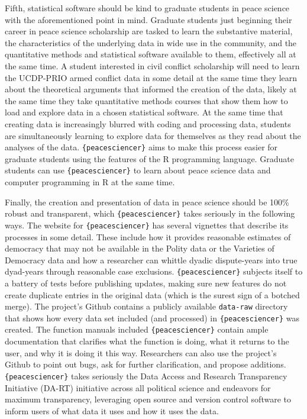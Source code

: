 \documentclass[
  11pt,
]{article}
\begin{document}
Fifth, statistical software should be kind to graduate students in peace science with the aforementioned point in mind. Graduate students just beginning their career in peace science scholarship are tasked to learn the substantive material, the characteristics of the underlying data in wide use in the community, and the quantitative methods and statistical software available to them, effectively all at the same time. A student interested in civil conflict scholarship will need to learn the UCDP-PRIO armed conflict data in some detail at the same time they learn about the theoretical arguments that informed the creation of the data, likely at the same time they take quantitative methods courses that show them how to load and explore data in a chosen statistical software. At the same time that creating data is increasingly blurred with coding and processing data, students are simultaneously learning to explore data for themselves as they read about the analyses of the data. \texttt{\{peacesciencer\}} aims to make this process easier for graduate students using the features of the R programming language. Graduate students can use \texttt{\{peacesciencer\}} to learn about peace science data and computer programming in R at the same time.

Finally, the creation and presentation of data in peace science should be 100\% robust and transparent, which \texttt{\{peacesciencer\}} takes seriously in the following ways. The website for \texttt{\{peacesciencer\}} has several vignettes that describe its processes in some detail. These include how it provides reasonable estimates of democracy that may not be available in the Polity data or the Varieties of Democracy data and how a researcher can whittle dyadic dispute-years into true dyad-years through reasonable case exclusions. \texttt{\{peacesciencer\}} subjects itself to a battery of tests before publishing updates, making sure new features do not create duplicate entries in the original data (which is the surest sign of a botched merge). The project's Github contains a publicly available \texttt{data-raw} directory that shows how every data set included (and processed) in \texttt{\{peacesciencer\}} was created. The function manuals included \texttt{\{peacesciencer\}} contain ample documentation that clarifies what the function is doing, what it returns to the user, and why it is doing it this way. Researchers can also use the project's Github to point out bugs, ask for further clarification, and propose additions. \texttt{\{peacesciencer\}} takes seriously the Data Access and Research Transparency Initiative (DA-RT) initiative across all political science and endeavors for maximum transparency, leveraging open source and version control software to inform users of what data it uses and how it uses the data.
\end{document}
